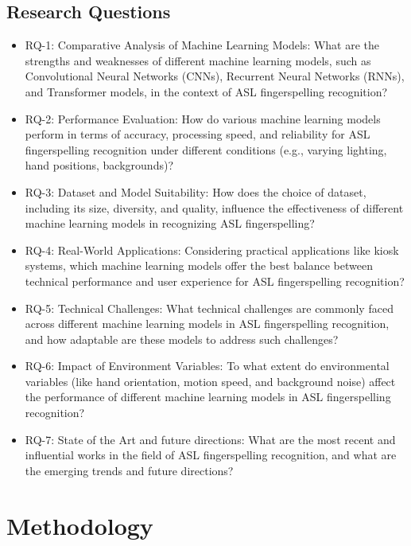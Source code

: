 \subsection{Research Questions}
\begin{itemize}
    \item RQ-1: Comparative Analysis of Machine Learning Models:
          What are the strengths and weaknesses of different machine learning models, such as Convolutional Neural Networks (CNNs), Recurrent Neural Networks (RNNs), and Transformer models, in the context of ASL fingerspelling recognition?
    \item RQ-2: Performance Evaluation:
          How do various machine learning models perform in terms of accuracy, processing speed, and reliability for ASL fingerspelling recognition under different conditions (e.g., varying lighting, hand positions, backgrounds)?
    \item RQ-3: Dataset and Model Suitability:
          How does the choice of dataset, including its size, diversity, and quality, influence the effectiveness of different machine learning models in recognizing ASL fingerspelling?
    \item RQ-4: Real-World Applications:
          Considering practical applications like kiosk systems, which machine learning models offer the best balance between technical performance and user experience for ASL fingerspelling recognition?
    \item RQ-5: Technical Challenges:
          What technical challenges are commonly faced across different machine learning models in ASL fingerspelling recognition, and how adaptable are these models to address such challenges?
    \item RQ-6: Impact of Environment Variables:
          To what extent do environmental variables (like hand orientation, motion speed, and background noise) affect the performance of different machine learning models in ASL fingerspelling recognition?
    \item RQ-7: State of the Art and future directions:
          What are the most recent and influential works in the field of ASL fingerspelling recognition, and what are the emerging trends and future directions?
\end{itemize}

\section{Methodology}

